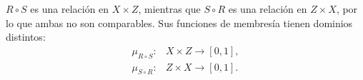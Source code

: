 
\(R\circ S\) es una relación en \(X × Z\), mientras que
\(S\circ R\) es una relación en \(Z × X\),
por lo que ambas no son comparables.
Sus funciones de membresía tienen dominios distintos:
\begin{align*}
  μ_{R\circ S}\colon & X × Z\to \left[0, 1\right], \\
  μ_{S\circ R}\colon & Z × X\to \left[0, 1\right].
\end{align*}

